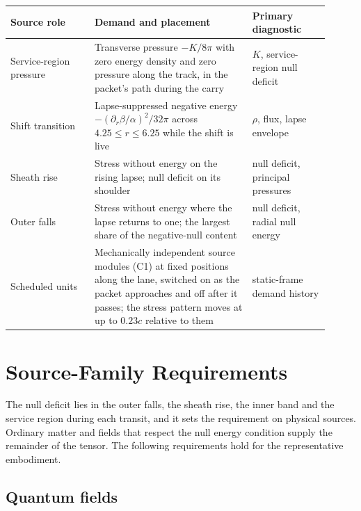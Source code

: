 \documentclass[11pt]{article}
\begin{document}
\begin{longtable}{L{0.24\linewidth}L{0.45\linewidth}L{0.22\linewidth}}
\toprule
\textbf{Source role} & \textbf{Demand and placement} & \textbf{Primary diagnostic} \\
\midrule
Service-region pressure & Transverse pressure $-K/8\pi$ with zero energy density and zero pressure along the track, in the packet's path during the carry & $K$, service-region null deficit \\
Shift transition & Lapse-suppressed negative energy $-(\partial_r\beta/\alpha)^2/32\pi$ across $4.25\le r\le6.25$ while the shift is live & $\rho$, flux, lapse envelope \\
Sheath rise & Stress without energy on the rising lapse; null deficit on its shoulder & null deficit, principal pressures \\
Outer falls & Stress without energy where the lapse returns to one; the largest share of the negative-null content & null deficit, radial null energy \\
Scheduled units & Mechanically independent source modules (C1) at fixed positions along the lane, switched on as the packet approaches and off after it passes; the stress pattern moves at up to $0.23c$ relative to them & static-frame demand history \\
\bottomrule
\end{longtable}

\section{Source-Family Requirements}
\label{sec:source_families}

The null deficit lies in the outer falls, the sheath rise, the inner band and the service region during each transit, and it sets the requirement on physical sources. Ordinary matter and fields that respect the null energy condition supply the remainder of the tensor. The following requirements hold for the representative embodiment.

\subsection{Quantum fields}
\end{document}
